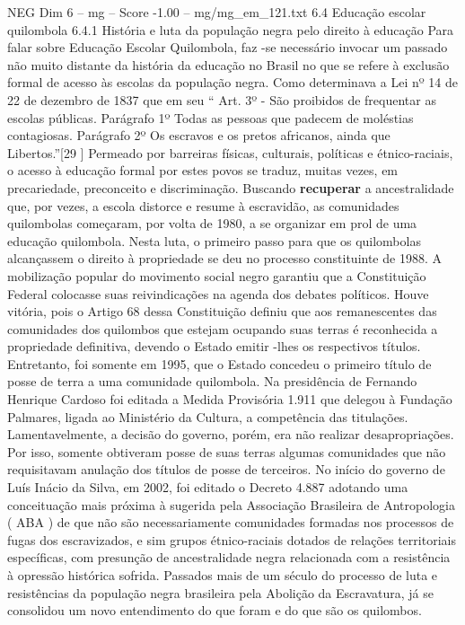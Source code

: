 \begin{textsample}{NEG Dim 6 – mg – Score -1.00 – mg/mg\_em\_121.txt}  \label{ex:f6_neg_042}
6.4 Educação escolar quilombola 6.4.1 História e luta da população negra pelo direito à educação Para falar sobre Educação Escolar Quilombola, faz -se necessário invocar um passado não muito distante da história da educação no Brasil no que se refere à exclusão formal de acesso às escolas da população negra.
Como determinava a Lei nº 14 de 22 de dezembro de 1837 que em seu “ Art. 3º - São proibidos de frequentar as escolas públicas.
Parágrafo 1º Todas as pessoas que padecem de moléstias contagiosas.
Parágrafo 2º Os escravos e os pretos africanos, ainda que Libertos.”[29 ] Permeado por barreiras físicas, culturais, políticas e étnico-raciais, o acesso à educação formal por estes povos se traduz, muitas vezes, em precariedade, preconceito e discriminação.
Buscando \textbf{recuperar} a ancestralidade que, por vezes, a escola distorce e resume à escravidão, as comunidades quilombolas começaram, por volta de 1980, a se organizar em prol de uma educação quilombola.
Nesta luta, o primeiro passo para que os quilombolas alcançassem o direito à propriedade se deu no processo constituinte de 1988.
A mobilização popular do movimento social negro garantiu que a Constituição Federal colocasse suas reivindicações na agenda dos debates políticos.
Houve vitória, pois o Artigo 68 dessa Constituição definiu que aos remanescentes das comunidades dos quilombos que estejam ocupando suas terras é reconhecida a propriedade definitiva, devendo o Estado emitir -lhes os respectivos títulos.
Entretanto, foi somente em 1995, que o Estado concedeu o primeiro título de posse de terra a uma comunidade quilombola.
Na presidência de Fernando Henrique Cardoso foi editada a Medida Provisória 1.911 que delegou à Fundação Palmares, ligada ao Ministério da Cultura, a competência das titulações.
Lamentavelmente, a decisão do governo, porém, era não realizar desapropriações.
Por isso, somente obtiveram posse de suas terras algumas comunidades que não requisitavam anulação dos títulos de posse de terceiros.
No início do governo de Luís Inácio da Silva, em 2002, foi editado o Decreto 4.887 adotando uma conceituação mais próxima à sugerida pela Associação Brasileira de Antropologia ( ABA ) de que não são necessariamente comunidades formadas nos processos de fugas dos escravizados, e sim grupos étnico-raciais dotados de relações territoriais específicas, com presunção de ancestralidade negra relacionada com a resistência à opressão histórica sofrida.
Passados mais de um século do processo de luta e resistências da população negra brasileira pela Abolição da Escravatura, já se consolidou um novo entendimento do que foram e do que são os quilombos.

\end{textsample}
